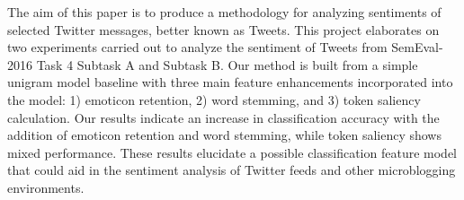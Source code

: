 The aim of this paper is to produce a methodology for analyzing sentiments of selected Twitter messages, better known as Tweets. This project elaborates on two experiments carried out to analyze the sentiment of Tweets from SemEval-2016 Task 4 Subtask A and Subtask B. Our method is built from a simple unigram model baseline with three main feature enhancements incorporated into the model: 1) emoticon retention, 2) word stemming, and 3) token saliency calculation. Our results indicate an increase in classification accuracy with the addition of emoticon retention and word stemming, while token saliency shows mixed performance. These results elucidate a possible classification feature model that could aid in the sentiment analysis of Twitter feeds and other microblogging environments.
